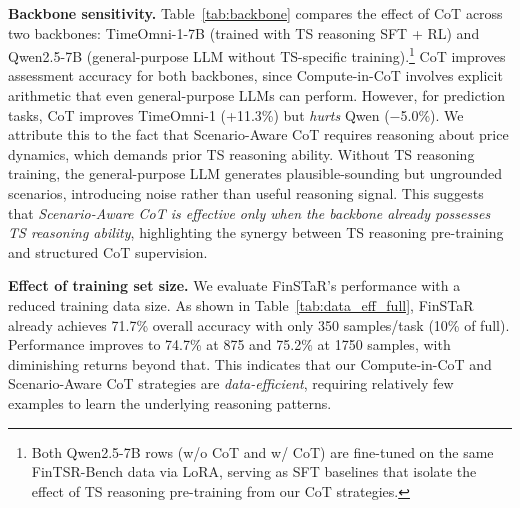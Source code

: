 \textbf{Backbone sensitivity.}
Table~\ref{tab:backbone} compares the effect of CoT across two backbones: TimeOmni-1-7B (trained with TS reasoning SFT + RL) and Qwen2.5-7B (general-purpose LLM without TS-specific training).\footnote{Both Qwen2.5-7B rows (w/o CoT and w/ CoT) are fine-tuned on the same FinTSR-Bench data via LoRA, serving as SFT baselines that isolate the effect of TS reasoning pre-training from our CoT strategies.}
CoT improves assessment accuracy for both backbones, since Compute-in-CoT involves explicit arithmetic that even general-purpose LLMs can perform.
However, for prediction tasks, CoT improves TimeOmni-1 (+11.3\%) but \textit{hurts} Qwen ($-$5.0\%).
We attribute this to the fact that Scenario-Aware CoT requires reasoning about price dynamics, which demands prior TS reasoning ability.
Without TS reasoning training, the general-purpose LLM generates plausible-sounding but ungrounded scenarios, introducing noise rather than useful reasoning signal.
This suggests that \textit{Scenario-Aware CoT is effective only when the backbone already possesses TS reasoning ability}, highlighting the synergy between TS reasoning pre-training and structured CoT supervision.


\textbf{Effect of training set size.} 
We evaluate FinSTaR’s performance with a reduced training data size.
As shown in Table~\ref{tab:data_eff_full}, FinSTaR already achieves 71.7\% overall accuracy
with only 350 samples/task (10\% of full).
Performance improves to 74.7\% at 875 and 75.2\% at 1750 samples, with diminishing returns beyond that.
This indicates that our Compute-in-CoT and Scenario-Aware CoT strategies are \textit{data-efficient}, requiring relatively few examples to learn the underlying reasoning patterns.

